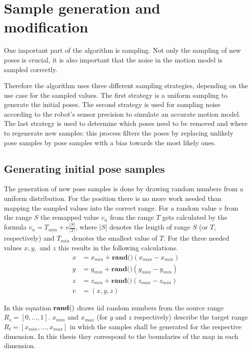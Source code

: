 \documentclass[Thesis.tex]{subfiles}
\begin{document}
\section{Sample generation and modification}

One important part of the algorithm is sampling. Not only the sampling of new poses is crucial, it is also important that the noise in the motion model is sampled correctly. 

Therefore the algorithm uses three different sampling strategies, depending on the use case for the sampled values. The first strategy is a uniform sampling to generate the initial poses. The second strategy is used for sampling noise according to the robot's sensor precision to simulate an accurate motion model. The last strategy is used to determine which poses need to be removed and where to regenerate new samples: this process filters the poses by replacing unlikely pose samples by pose samples with a bias towards the most likely ones.

\subsection{Generating initial pose samples}
The generation of new pose samples is done by drawing random numbers from a uniform distribution. For the position there is no more work needed than mapping the sampled values into the correct range. For a random value $v$ from the range $S$ the remapped value $v_n$ from the range $T$ gets calculated by the formula $v_n = T_{min} + v \frac{|S|}{|T|}$, where $|S|$ denotes the length of range $S$ (or $T$, respectively) and $T_{min}$ denotes the smallest value of $T$. For the three needed values $x, y,$ and $z$ this results in the following calculations.
%
\begin{align}
x &= x_{min} + \textbf{rand()} \left( x_{max} - x_{min} \right) \\
y &= y_{min} + \textbf{rand()} \left( y_{max} - y_{min} \right) \\
z &= z_{min} + \textbf{rand()} \left( z_{max} - z_{min} \right) \\
v &= (x, y, z)
\end{align}

In this equation ${\bf rand()}$ draws \gls{iid} random numbers from the source range $R_s = \left[0, \dots, 1\right]$. $x_{min}$ and $x_{max}$ (for $y$ and $z$ respectively) describe the target range $R_t = \left[x_{min}, \dots, x_{max}\right]$ in which the samples shall be generated for the respective dimension. In this thesis they correspond to the boundaries of the map in each dimension.
\end{document}

